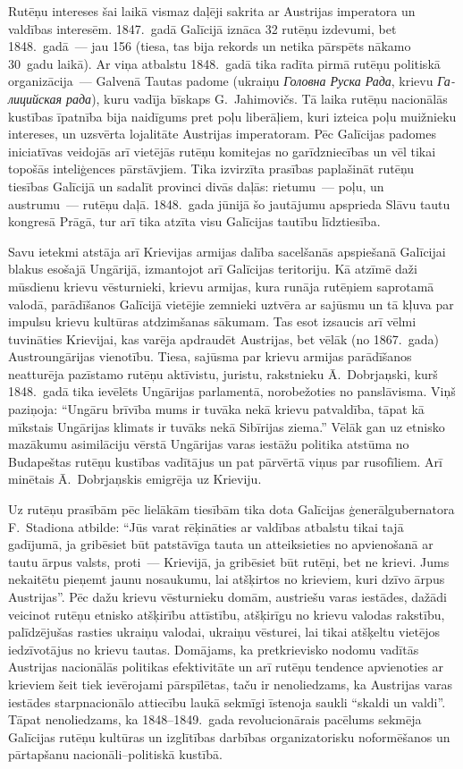 \documentclass[twoside,a5paper,12pt,fleqn,openany]{extbook}
\newcommand{\rutxti}[1]{\textit{\textrussian{#1}}}
\newcommand{\uktxti}[1]{\textit{\textukrainian{#1}}}
\begin{document}
Rutēņu intereses šai laikā vismaz daļēji sakrita ar Austrijas imperatora un valdības interesēm. 1847.~gadā Galīcijā iznāca 32 rutēņu izdevumi, bet 1848.~gadā~--- jau 156 (tiesa, tas bija rekords un netika pārspēts nākamo 30~gadu laikā). Ar viņa atbalstu 1848.~gadā tika radīta pirmā rutēņu politiskā organizācija~--- Galvenā Tautas padome (ukraiņu \uktxti{Головна Руска Рада}, krievu \rutxti{Галицийская рада}), kuru vadīja bīskaps G.~Jahimovičs. Tā laika rutēņu nacionālās kustības īpatnība bija naidīgums pret poļu liberāļiem, kuri izteica poļu muižnieku intereses, un uzsvērta lojalitāte Austrijas imperatoram. Pēc Galīcijas padomes iniciatīvas veidojās arī vietējās rutēņu komitejas no garīdzniecības un vēl tikai topošās inteliģences pārstāvjiem. Tika izvirzīta prasības paplašināt rutēņu tiesības Galīcijā un sadalīt provinci divās daļās: rietumu~--- poļu, un austrumu~--- rutēņu daļā. 1848.~gada jūnijā šo jautājumu apsprieda Slāvu tautu kongresā Prāgā, tur arī tika atzīta visu Galīcijas tautību līdztiesība.

Savu ietekmi atstāja arī Krievijas armijas dalība sacelšanās apspiešanā Galīcijai blakus esošajā Ungārijā, izmantojot arī Galīcijas teritoriju. Kā atzīmē daži mūsdienu krievu vēsturnieki, krievu armijas, kura runāja rutēņiem saprotamā valodā, parādīšanos Galīcijā vietējie zemnieki uztvēra ar sajūsmu un tā kļuva par impulsu krievu kultūras atdzimšanas sākumam. Tas esot izsaucis arī vēlmi tuvināties Krievijai, kas varēja apdraudēt Austrijas, bet vēlāk (no 1867.~gada) Austroungārijas vienotību. Tiesa, sajūsma par krievu armijas parādīšanos neatturēja pazīstamo rutēņu aktīvistu, juristu, rakstnieku Ā.~Dobrjaņski, kurš 1848.~gadā tika ievēlēts Ungārijas parlamentā, norobežoties no panslāvisma. Viņš paziņoja: ``Ungāru brīvība mums ir tuvāka nekā krievu patvaldība, tāpat kā mīkstais Ungārijas klimats ir tuvāks nekā Sibīrijas ziema.'' Vēlāk gan uz etnisko mazākumu asimilāciju vērstā Ungārijas varas iestāžu politika atstūma no Budapeštas rutēņu kustības vadītājus un pat pārvērtā viņus par rusofīliem. Arī minētais Ā.~Dobrjaņskis emigrēja uz Krieviju.

Uz rutēņu prasībām pēc lielākām tiesībām tika dota Galīcijas ģenerālgubernatora F.~Stadiona atbilde: ``Jūs varat rēķināties ar valdības atbalstu tikai tajā gadījumā, ja gribēsiet būt patstāvīga tauta un atteiksieties no apvienošanā ar tautu ārpus valsts, proti~--- Krievijā, ja gribēsiet būt rutēņi, bet ne krievi. Jums nekaitētu pieņemt jaunu nosaukumu, lai atšķirtos no krieviem, kuri dzīvo ārpus Austrijas''. Pēc dažu krievu vēsturnieku domām, austriešu varas iestādes, dažādi veicinot rutēņu etnisko atšķirību attīstību, atšķirīgu no krievu valodas rakstību, palīdzējušas rasties ukraiņu valodai, ukraiņu vēsturei, lai tikai atšķeltu vietējos iedzīvotājus no krievu tautas. Domājams, ka pretkrievisko nodomu vadītās Austrijas nacionālās politikas efektivitāte un arī rutēņu tendence apvienoties ar krieviem šeit tiek ievērojami pārspīlētas, taču ir nenoliedzams, ka Austrijas varas iestādes starpnacionālo attiecību laukā sekmīgi īstenoja saukli ``skaldi un valdi''. Tāpat nenoliedzams, ka 1848--1849.~gada revolucionārais pacēlums sekmēja Galīcijas rutēņu kultūras un izglītības darbības organizatorisku noformēšanos un pārtapšanu nacionāli--politiskā kustībā.
\end{document}
